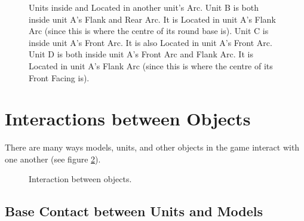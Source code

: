 \begin{figure}[!htbp]
	\begin{minipage}{0.55\textwidth}
	\renewcommand{\figbiglettersize}{19}
	\def\svgwidth{\textwidth}
	
	\end{minipage}\hfill\begin{minipage}{0.42\textwidth}
	\caption{Units inside and Located in another unit's Arc.\captionpar
	Unit B is both inside unit A's Flank and Rear Arc. It is Located in unit A's Flank Arc (since this is where the centre of its round base is).\newline
	Unit C is inside unit A's Front Arc. It is also Located in unit A's Front Arc.\newline
	Unit D is both inside unit A's Front Arc and Flank Arc. It is Located in unit A's Flank Arc (since this is where the centre of its Front Facing is).
	}
	\label{figure/located_in_an_arc}
	\end{minipage}
\end{figure}

\newpage
\section{Interactions between Objects}
\label{interactions_between_objects}

There are many ways models, units, and other objects in the game interact with one another (see figure \ref{figure/contact}).

\newcommand{\CONTACTa}{a)}
\newcommand{\CONTACTb}{b)}
\newcommand{\CONTACTc}{c)}
\newcommand{\CONTACTd}{d)}

\begin{figure}[!htbp]
\def\svgwidth{\textwidth}

\caption{Interaction between objects.}
\label{figure/contact}
\end{figure}

\subsection{Base Contact between Units and Models}
\label{base_contact_between_units_and_models}

